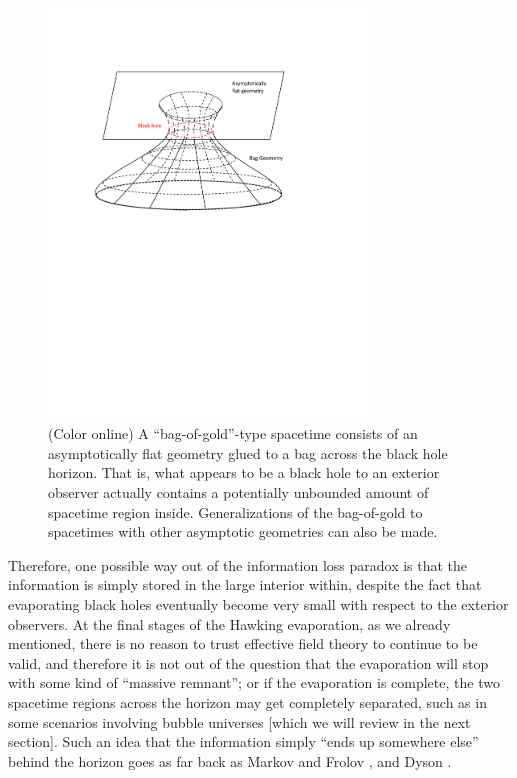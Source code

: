 \documentclass[12pt]{article}
\newcommand{\2}{$^2$}
\newcommand{\3}{$^3$}
\newcommand{\4}{$_4$}
\newcommand{\5}{$_5$}
\begin{document}
\begin{figure}
\centering
    \includegraphics[width=0.75\textwidth]{bag.pdf}
    \caption[A ``bag-of-gold''-type spacetime.]{(Color online) A ``bag-of-gold''-type spacetime consists of an asymptotically flat geometry glued to a bag across the black hole horizon. That is, what appears to be a black hole to an exterior observer actually contains a potentially unbounded amount of spacetime region inside. Generalizations of the bag-of-gold to spacetimes with other asymptotic geometries can also be made. \label{bag}} 
\end{figure}


Therefore, one possible way out of the information loss paradox is that the information is simply stored in the large interior within, despite the fact that evaporating black holes eventually become very small with respect to the exterior observers. At the final stages of the Hawking evaporation, as we already mentioned, there is no reason to trust effective field theory to continue to be valid, and therefore it is not out of the question that the evaporation will stop with some kind of ``massive remnant''; or if the evaporation is complete, the two spacetime regions across the horizon may get completely separated, such as in some scenarios involving bubble universes [which we will review in the next section]. Such an idea that the information simply ``ends up somewhere else'' behind the horizon goes as far back as Markov and Frolov \cite{MM0}, and Dyson \cite{dyson}.
\end{document}
